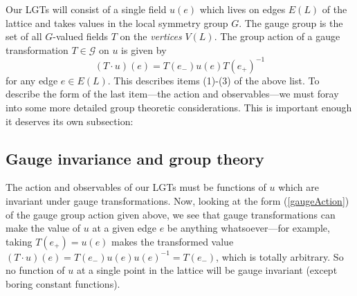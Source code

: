 \documentclass[9pt,twocolumn,twoside]{article}
\begin{document}
Our LGTs will consist of a single field $u(e)$ which lives on edges $E(L)$ of the lattice and takes values in the local symmetry group $G$.  The gauge group is the set of all $G$-valued fields $T$ on the \textit{vertices} $V(L)$.  The group action of a gauge transformation $T\in\mathcal{G}$ on $u$ is given by 
\begin{equation}
(T\cdot u)(e) = T(e_-) u(e) T(e_+)^{-1}
\label{gaugeAction}
\end{equation}
for any edge $e\in E(L)$.  This describes items (1)-(3) of the above list.  To describe the form of the last item---the action and observables---we must foray into some more detailed group theoretic considerations.  This is important enough it deserves its own subsection:

\subsection{Gauge invariance and group theory}
The action and observables of our LGTs must be functions of $u$ which are invariant under gauge transformations.  Now, looking at the form (\ref{gaugeAction}) of the gauge group action given above, we see that gauge transformations can make the value of $u$ at a given edge $e$ be anything whatsoever---for example, taking $T(e_+)=u(e)$ makes the transformed value $(T\cdot u)(e) = T(e_-) u(e) u(e)^{-1} = T(e_-)$, which is totally arbitrary.  So no function of $u$ at a single point in the lattice will be gauge invariant (except boring constant functions).  
\end{document}
